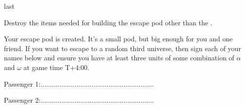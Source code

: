 \documentclass[greennotebook]{guildcamp3} %
\begin{document}
\begin{page}[at last...]{last}
	
Destroy the items needed for building the escape pod other than the \iScrewdriver{}.

Your escape pod is created. It's a small pod, but big enough for you and one friend. If you want to escape to a random third universe, then sign each of your names below and ensure you have at least three units of some combination of $\alpha$ and $\omega$ at game time T+4:00. 

Passenger 1:............................................................

Passenger 2:............................................................


\end{page}



\endnotebook
\end{document}

